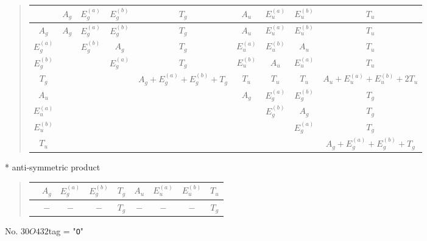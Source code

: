\documentclass[fleqn,10pt,landscape]{jsarticle}
\begin{document}
\begin{quote}
\begin{tabular}{c|cccccccc} \hline \hline
 & $ A_{g} $ & $ E_{g}^{(a)} $ & $ E_{g}^{(b)} $ & $ T_{g} $ & $ A_{u} $ & $ E_{u}^{(a)} $ & $ E_{u}^{(b)} $ & $ T_{u} $ \\ \hline
$ A_{g} $ & $ A_{g} $ & $ E_{g}^{(a)} $ & $ E_{g}^{(b)} $ & $ T_{g} $ & $ A_{u} $ & $ E_{u}^{(a)} $ & $ E_{u}^{(b)} $ & $ T_{u} $ \\
$ E_{g}^{(a)} $ & $  $ & $ E_{g}^{(b)} $ & $ A_{g} $ & $ T_{g} $ & $ E_{u}^{(a)} $ & $ E_{u}^{(b)} $ & $ A_{u} $ & $ T_{u} $ \\
$ E_{g}^{(b)} $ & $  $ & $  $ & $ E_{g}^{(a)} $ & $ T_{g} $ & $ E_{u}^{(b)} $ & $ A_{u} $ & $ E_{u}^{(a)} $ & $ T_{u} $ \\
$ T_{g} $ & $  $ & $  $ & $  $ & $ A_{g} + E_{g}^{(a)} + E_{g}^{(b)} + T_{g} $ & $ T_{u} $ & $ T_{u} $ & $ T_{u} $ & $ A_{u} + E_{u}^{(a)} + E_{u}^{(b)} + 2 T_{u} $ \\
$ A_{u} $ & $  $ & $  $ & $  $ & $  $ & $ A_{g} $ & $ E_{g}^{(a)} $ & $ E_{g}^{(b)} $ & $ T_{g} $ \\
$ E_{u}^{(a)} $ & $  $ & $  $ & $  $ & $  $ & $  $ & $ E_{g}^{(b)} $ & $ A_{g} $ & $ T_{g} $ \\
$ E_{u}^{(b)} $ & $  $ & $  $ & $  $ & $  $ & $  $ & $  $ & $ E_{g}^{(a)} $ & $ T_{g} $ \\
$ T_{u} $ & $  $ & $  $ & $  $ & $  $ & $  $ & $  $ & $  $ & $ A_{g} + E_{g}^{(a)} + E_{g}^{(b)} + T_{g} $ \\
 \hline \hline
\end{tabular}
\end{quote}
* anti-symmetric product
\begin{quote}
\begin{tabular}{ccccccccc} \hline \hline
 & $ A_{g} $ & $ E_{g}^{(a)} $ & $ E_{g}^{(b)} $ & $ T_{g} $ & $ A_{u} $ & $ E_{u}^{(a)} $ & $ E_{u}^{(b)} $ & $ T_{u} $ \\ \hline
$  $ & $ - $ & $ - $ & $ - $ & $ T_{g} $ & $ - $ & $ - $ & $ - $ & $ T_{g} $ \\
 \hline \hline
\end{tabular}
\end{quote}
\newpage
No. 30\quad$O$\quad$432$\quad[ cubic ]
tag = "{\tt O}"
\end{document}
